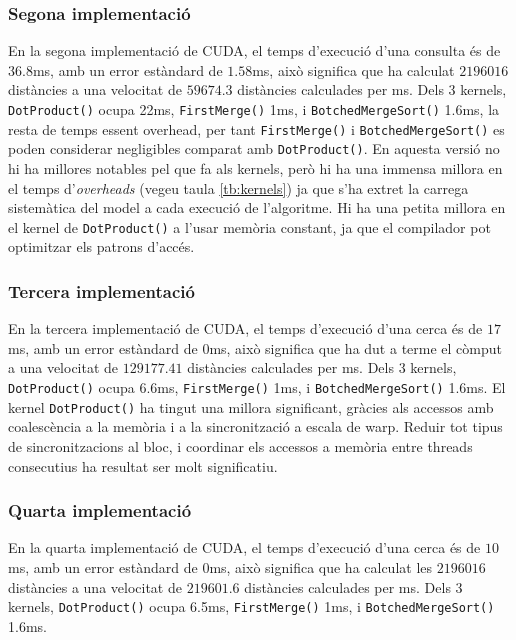 \documentclass[catalan,10pt,a4paper]{article}
\begin{document}
\subsubsection*{Segona implementació}
En la segona implementació de CUDA, el temps d'execució d'una consulta és de $36.8$ms, amb un error estàndard de $1.58$ms, això significa que ha calculat $2196016$ distàncies a una velocitat de $59674.3$ distàncies calculades per ms. Dels 3 kernels, \verb|DotProduct()| ocupa 22ms, \verb|FirstMerge()| 1ms, i \verb|BotchedMergeSort()| 1.6ms, la resta de temps essent overhead, per tant \verb|FirstMerge()| i \verb|BotchedMergeSort()| es poden considerar negligibles comparat amb \verb|DotProduct()|.
En aquesta versió no hi ha millores notables pel que fa als kernels, però hi ha una immensa millora en el temps d'\textit{overheads} (vegeu taula \ref{tb:kernels})  ja que s'ha extret la carrega sistemàtica del model a cada execució de l'algoritme. Hi ha una petita millora en el kernel de \verb|DotProduct()| a l'usar memòria constant, ja que el compilador pot optimitzar els patrons d'accés.
\subsubsection*{Tercera implementació}
En la tercera implementació de CUDA, el temps d'execució d'una cerca és de $17$ms, amb un error estàndard de $0$ms, això significa que ha dut a terme el còmput a una velocitat de $129177.41$ distàncies calculades per ms. Dels 3 kernels, \verb|DotProduct()| ocupa 6.6ms, \verb|FirstMerge()| 1ms, i \verb|BotchedMergeSort()| 1.6ms. 
El kernel \verb|DotProduct()| ha tingut una millora significant, gràcies als accessos amb coalescència a la memòria i a la sincronització a escala de warp. Reduir tot tipus de sincronitzacions al bloc, i coordinar els accessos a memòria entre threads consecutius ha resultat ser molt significatiu.
\subsubsection*{Quarta implementació}
En la quarta implementació de CUDA, el temps d'execució d'una cerca és de $10$ms, amb un error estàndard de $0$ms, això significa que ha calculat les $2196016$ distàncies a una velocitat de $219601.6$ distàncies calculades per ms. Dels 3 kernels, \verb|DotProduct()| ocupa 6.5ms, \verb|FirstMerge()| 1ms, i \verb|BotchedMergeSort()| 1.6ms.
 
\end{document}
